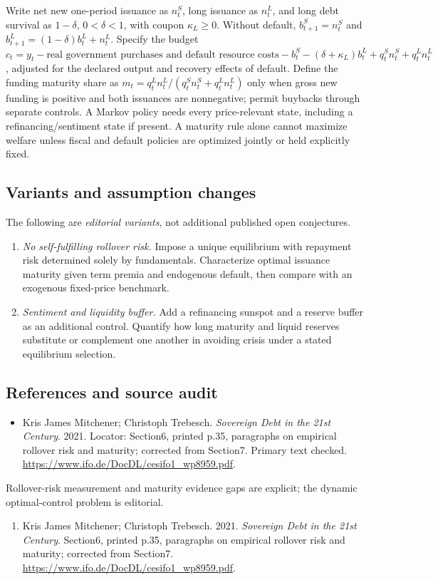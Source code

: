 \documentclass[11pt,a4paper]{article}
\begin{document}
Write net new one-period issuance as \(n_t^S\), long issuance as \(n_t^L\), and long debt survival as \(1-\delta\), \(0<\delta<1\), with coupon \(\kappa_L\ge0\). Without default, \(b_{t+1}^S=n_t^S\) and \(b_{t+1}^L=(1-\delta)b_t^L+n_t^L\). Specify the budget \(c_t=y_t-\text{real government purchases and default resource costs}-b_t^S-(\delta+\kappa_L)b_t^L+q_t^Sn_t^S+q_t^Ln_t^L\), adjusted for the declared output and recovery effects of default. Define the funding maturity share as \(m_t=q_t^Ln_t^L/(q_t^Sn_t^S+q_t^Ln_t^L)\) only when gross new funding is positive and both issuances are nonnegative; permit buybacks through separate controls. A Markov policy needs every price-relevant state, including a refinancing/sentiment state if present. A maturity rule alone cannot maximize welfare unless fiscal and default policies are optimized jointly or held explicitly fixed.
\subsection*{Variants and assumption changes}
The following are \emph{editorial variants}, not additional published open conjectures.
\begin{enumerate}
\item \emph{No self-fulfilling rollover risk.} Impose a unique equilibrium with repayment risk determined solely by fundamentals. Characterize optimal issuance maturity given term premia and endogenous default, then compare with an exogenous fixed-price benchmark.
\item \emph{Sentiment and liquidity buffer.} Add a refinancing sunspot and a reserve buffer as an additional control. Quantify how long maturity and liquid reserves substitute or complement one another in avoiding crisis under a stated equilibrium selection.
\end{enumerate}
\subsection*{References and source audit}
\begin{itemize}
\item Kris James Mitchener; Christoph Trebesch. \emph{Sovereign Debt in the 21st Century}. 2021. Locator: Section6, printed p.35, paragraphs on empirical rollover risk and maturity; corrected from Section7. Primary text checked. \url{https://www.ifo.de/DocDL/cesifo1_wp8959.pdf}.
\end{itemize}
Rollover-risk measurement and maturity evidence gaps are explicit; the dynamic optimal-control problem is editorial.
\begin{enumerate}\raggedright
\item\hypertarget{definitions:source:30007538:1}{} Kris James Mitchener; Christoph Trebesch. 2021. \emph{Sovereign Debt in the 21st Century}. Section6, printed p.35, paragraphs on empirical rollover risk and maturity; corrected from Section7.
\url{https://www.ifo.de/DocDL/cesifo1_wp8959.pdf}.
\end{enumerate}
\end{document}
